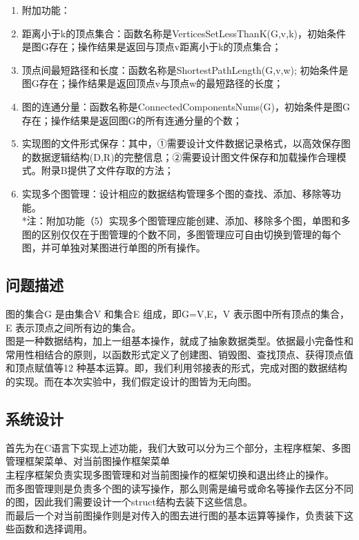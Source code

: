 \documentclass[supercite]{Experimental_Report}
\theoremstyle{definition}
\begin{document}
\begin{enumerate}
	\item 	附加功能：
	\item	距离小于k的顶点集合：函数名称是VerticesSetLessThanK(G,v,k)，初始条件是图G存在；操作结果是返回与顶点v距离小于k的顶点集合；
	\item	顶点间最短路径和长度：函数名称是ShortestPathLength(G,v,w); 初始条件是图G存在；操作结果是返回顶点v与顶点w的最短路径的长度；
	\item	图的连通分量：函数名称是ConnectedComponentsNums(G)，初始条件是图G存在；操作结果是返回图G的所有连通分量的个数；
	\item	实现图的文件形式保存：其中，①需要设计文件数据记录格式，以高效保存图的数据逻辑结构(D,{R})的完整信息；②需要设计图文件保存和加载操作合理模式。附录B提供了文件存取的方法；
	\item	实现多个图管理：设计相应的数据结构管理多个图的查找、添加、移除等功能。\\
	*注：附加功能（5）实现多个图管理应能创建、添加、移除多个图，单图和多图的区别仅仅在于图管理的个数不同，多图管理应可自由切换到管理的每个图，并可单独对某图进行单图的所有操作。
\end{enumerate}

\subsection{问题描述}

图的集合G 是由集合V 和集合E 组成，即G=V,E，V 表示图中所有顶点的集合，E 表示顶点之间所有边的集合。\\
图是一种数据结构，加上一组基本操作，就成了抽象数据类型。依据最小完备性和常用性相结合的原则，以函数形式定义了创建图、销毁图、查找顶点、获得顶点值和顶点赋值等12 种基本运算。即，我们利用邻接表的形式，完成对图的数据结构的实现。而在本次实验中，我们假定设计的图皆为无向图。

\subsection{系统设计}
首先为在C语言下实现上述功能，我们大致可以分为三个部分，主程序框架、多图管理框架菜单、对当前图操作框架菜单\\主程序框架负责实现多图管理和对当前图操作的框架切换和退出终止的操作。\\
而多图管理则是负责多个图的读写操作，那么则需是编号或命名等操作去区分不同的图，因此我们需要设计一个struct结构去装下这些信息。\\
而最后一个对当前图操作则是对传入的图去进行图的基本运算等操作，负责装下这些函数和选择调用。
\end{document}
